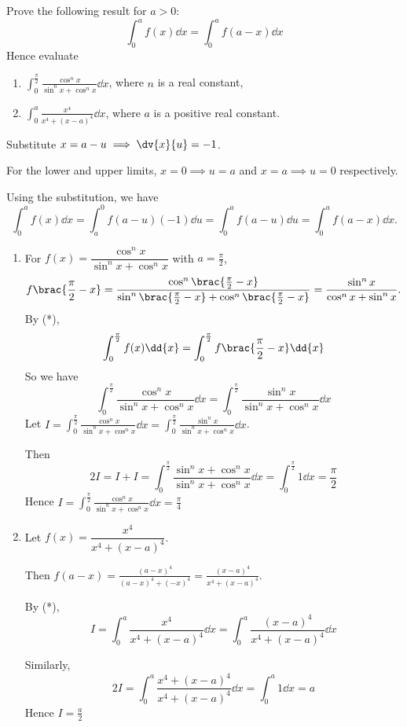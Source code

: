 \begin{exercise}
Prove the following result for $a>0$:
\begin{equation*}\tag{*}
\int_0^af(x)\dd{x}=\int_0^af(a-x)\dd{x}
\end{equation*}
Hence evaluate
\begin{enumerate}[label=(\alph*)]
\item $\displaystyle\int_0^\frac{\pi}{2}\frac{\cos^nx}{\sin^nx+\cos^nx}\dd{x}$, where $n$ is a real constant,
\item $\displaystyle\int_0^a\frac{x^4}{x^4+(x-a)^4}\dd{x}$, where $a$ is a positive real constant.
\end{enumerate}
\end{exercise}
\begin{solution}
Substitute $x=a-u\implies\dv{x}{u}=-1$.

For the lower and upper limits, $x=0\implies u=a$ and $x=a\implies u=0$ respectively.

Using the substitution, we have
\[ \int_0^af(x)\dd{x}=\int_a^0f(a-u)(-1)\dd{u}=\int_0^af(a-u)\dd{u}=\int_0^af(a-x)\dd{x}. \]

\begin{enumerate}[label=(\alph*)]
\item For $f(x)=\dfrac{\cos^nx}{\sin^nx+\cos^nx}$ with $a=\frac{\pi}{2}$,
\[ f\brac{\frac{\pi}{2}-x}=\frac{\cos^n\brac{\frac{\pi}{2}-x}}{\sin^n\brac{\frac{\pi}{2}-x}+\cos^n\brac{\frac{\pi}{2}-x}}=\frac{\sin^nx}{\cos^nx+\sin^nx}. \]
By (*), 
\[ \int_0^\frac{\pi}{2}f(x)\dd{x}=\int_0^\frac{\pi}{2}f\brac{\frac{\pi}{2}-x}\dd{x} \]
So we have
\[ \int_0^\frac{\pi}{2}\frac{\cos^nx}{\sin^nx+\cos^nx}\dd{x}=\int_0^\frac{\pi}{2}\frac{\sin^nx}{\sin^nx+\cos^nx}\dd{x} \]
Let $\displaystyle I=\int_0^\frac{\pi}{2}\frac{\cos^nx}{\sin^nx+\cos^nx}\dd{x}=\int_0^\frac{\pi}{2}\frac{\sin^nx}{\sin^nx+\cos^nx}\dd{x}$.

Then
\[ 2I=I+I=\int_0^\frac{\pi}{2}\frac{\sin^nx+\cos^nx}{\sin^nx+\cos^nx}\dd{x}=\int_0^\frac{\pi}{2}1\dd{x}=\frac{\pi}{2} \]
Hence $\displaystyle I=\int_0^\frac{\pi}{2}\frac{\cos^nx}{\sin^nx+\cos^nx}\dd{x}=\boxed{\frac{\pi}{4}}$

\item Let $f(x)=\dfrac{x^4}{x^4+(x-a)^4}$.

Then $f(a-x)=\frac{(a-x)^4}{(a-x)^4+(-x)^4}=\frac{(x-a)^4}{x^4+(x-a)^4}$.

By (*),
\[ I=\int_0^a\frac{x^4}{x^4+(x-a)^4}\dd{x}=\int_0^a\frac{(x-a)^4}{x^4+(x-a)^4}\dd{x} \]

Similarly, 
\[ 2I=\int_0^a\frac{x^4+(x-a)^4}{x^4+(x-a)^4}\dd{x}=\int_0^a1\dd{x}=a \]
Hence $I=\boxed{\frac{a}{2}}$
\end{enumerate}
\end{solution}

